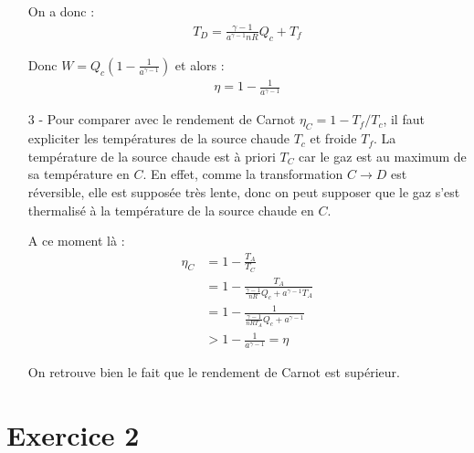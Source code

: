 \documentclass{report}
\begin{document}
\begin{itemize}
On a donc :
\begin{align*}
	T_D = \frac{\gamma-1}{a^{\gamma-1}nR}Q_c+T_f
\end{align*}

Donc $W=Q_c\left( 1-\frac{1}{a^{\gamma-1}}\right) $ et alors :
\begin{align*}
	\eta= 1-\frac{1}{a^{\gamma-1}}
\end{align*}

	\item[3 -] Pour comparer avec le rendement de Carnot $\eta_C=1-T_f/T_c$, il faut expliciter les températures de la source chaude $T_c$ et froide $T_f$. La température de la source chaude est à priori $T_C$ car le gaz est au maximum de sa température en $C$. En effet, comme la transformation $C\longrightarrow D$ est réversible, elle est supposée très lente, donc on peut supposer que le gaz s'est thermalisé à la température de la source chaude en $C$. 
	
	A ce moment là :
	\begin{align*}
		\eta_C&=1-\frac{T_A}{T_C}\\
		&=1-\frac{T_A}{\frac{\gamma-1}{nR}Q_c+a^{\gamma-1}T_A}\\
		&=1-\frac{1}{\frac{\gamma-1}{nRT_A}Q_c+a^{\gamma-1}}\\
		&>1-\frac{1}{a^{\gamma-1}} = \eta
	\end{align*}

On retrouve bien le fait que le rendement de Carnot est supérieur.

\end{itemize}

\section*{Exercice 2}
\end{document}
